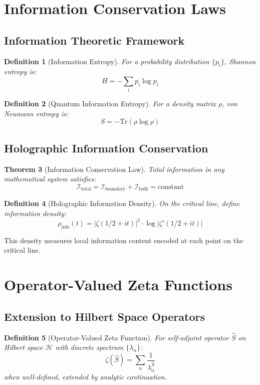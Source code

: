 \documentclass[12pt]{article}
\newtheorem{theorem}{Theorem}[section]
\newtheorem{definition}[theorem]{Definition}
\begin{document}
\section{Information Conservation Laws}

\subsection{Information Theoretic Framework}

\begin{definition}[Information Entropy]
For a probability distribution $\{p_i\}$, Shannon entropy is:
$$H = -\sum_i p_i \log p_i$$
\end{definition}

\begin{definition}[Quantum Information Entropy]
For a density matrix $\rho$, von Neumann entropy is:
$$S = -\text{Tr}(\rho \log \rho)$$
\end{definition}

\subsection{Holographic Information Conservation}

\begin{theorem}[Information Conservation Law]
Total information in any mathematical system satisfies:
$$\mathcal{I}_{\text{total}} = \mathcal{I}_{\text{boundary}} + \mathcal{I}_{\text{bulk}} = \text{constant}$$
\end{theorem}

\begin{definition}[Holographic Information Density]
On the critical line, define information density:
$$\rho_{\text{info}}(t) = |\zeta(1/2 + it)|^2 \cdot \log|\zeta'(1/2 + it)|$$
\end{definition}

This density measures local information content encoded at each point on the critical line.

\section{Operator-Valued Zeta Functions}

\subsection{Extension to Hilbert Space Operators}

\begin{definition}[Operator-Valued Zeta Function]
For self-adjoint operator $\hat{S}$ on Hilbert space $\mathcal{H}$ with discrete spectrum $\{\lambda_n\}$:
$$\zeta(\hat{S}) = \sum_{n} \frac{1}{\lambda_n^{\hat{S}}}$$
when well-defined, extended by analytic continuation.
\end{definition}
\end{document}
